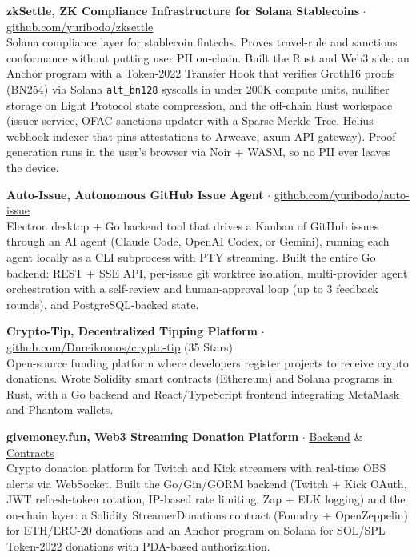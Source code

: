 \documentclass[10pt,a4paper]{article}
\begin{document}
\vspace{4pt}
\noindent\textbf{\footnotesize zkSettle, ZK Compliance Infrastructure for Solana Stablecoins} {\footnotesize $\cdot$ \href{https://github.com/yuribodo/zksettle}{github.com/yuribodo/zksettle}}\\
{\footnotesize Solana compliance layer for stablecoin fintechs. Proves travel-rule and sanctions conformance without putting user PII on-chain. Built the Rust and Web3 side: an Anchor program with a Token-2022 Transfer Hook that verifies Groth16 proofs (BN254) via Solana \texttt{alt\_bn128} syscalls in under 200K compute units, nullifier storage on Light Protocol state compression, and the off-chain Rust workspace (issuer service, OFAC sanctions updater with a Sparse Merkle Tree, Helius-webhook indexer that pins attestations to Arweave, axum API gateway). Proof generation runs in the user's browser via Noir + WASM, so no PII ever leaves the device.}

\vspace{4pt}
\noindent\textbf{\footnotesize Auto-Issue, Autonomous GitHub Issue Agent} {\footnotesize $\cdot$ \href{https://github.com/yuribodo/auto-issue}{github.com/yuribodo/auto-issue}}\\
{\footnotesize Electron desktop + Go backend tool that drives a Kanban of GitHub issues through an AI agent (Claude Code, OpenAI Codex, or Gemini), running each agent locally as a CLI subprocess with PTY streaming. Built the entire Go backend: REST + SSE API, per-issue git worktree isolation, multi-provider agent orchestration with a self-review and human-approval loop (up to 3 feedback rounds), and PostgreSQL-backed state.}

\vspace{4pt}
\noindent\textbf{\footnotesize Crypto-Tip, Decentralized Tipping Platform} {\footnotesize $\cdot$ \href{https://github.com/Dnreikronos/crypto-tip}{github.com/Dnreikronos/crypto-tip} (35 Stars)}\\
{\footnotesize Open-source funding platform where developers register projects to receive crypto donations. Wrote Solidity smart contracts (Ethereum) and Solana programs in Rust, with a Go backend and React/TypeScript frontend integrating MetaMask and Phantom wallets.}

\vspace{4pt}
\noindent\textbf{\footnotesize givemoney.fun, Web3 Streaming Donation Platform} {\footnotesize $\cdot$ \href{https://github.com/Dnreikronos/givememoney.fun-backend}{Backend} \& \href{https://github.com/Dnreikronos/givememoney.fun-crypto}{Contracts}}\\
{\footnotesize Crypto donation platform for Twitch and Kick streamers with real-time OBS alerts via WebSocket. Built the Go/Gin/GORM backend (Twitch + Kick OAuth, JWT refresh-token rotation, IP-based rate limiting, Zap + ELK logging) and the on-chain layer: a Solidity StreamerDonations contract (Foundry + OpenZeppelin) for ETH/ERC-20 donations and an Anchor program on Solana for SOL/SPL Token-2022 donations with PDA-based authorization.}
\end{document}
